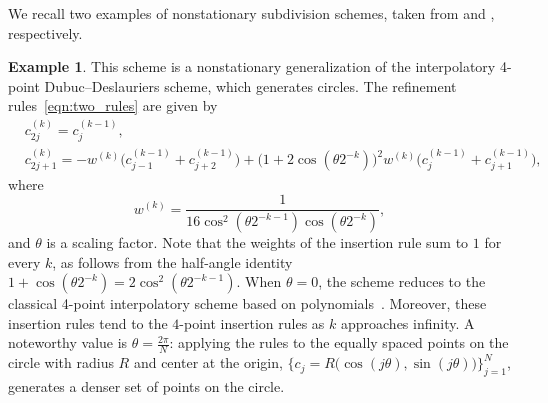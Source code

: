 \documentclass[11pt,a4paper]{article}
\theoremstyle{definition}
\newtheorem{example}[theorem]{Example}
\begin{document}
We recall two examples of nonstationary subdivision schemes, taken from \cite{dyn2003exponentials} and \cite{conti2017beyond}, respectively.

\begin{example}\label{NS example 4-pt}
This scheme is a nonstationary generalization of the interpolatory 4-point Dubuc--Deslauriers scheme, which generates circles. The refinement rules~\eqref{eqn:two_rules} are given by
\begin{equation} \label{NS 4-pt}
\begin{split}
    & c_{2j}^{(k)}=c_j^{(k-1)},\\
    & c_{2j+1}^{(k)}=-w^{(k)}\big(c^{(k-1)}_{j-1}+c^{(k-1)}_{j+2}\big) + \big(1+2\cos(\theta 2^{-k})\big)^2 w^{(k)} \big(c^{(k-1)}_{j}+c^{(k-1)}_{j+1}\big),
\end{split}
\end{equation}
where
\begin{equation*}
    w^{(k)}=\frac{1}{16 \cos^2(\theta 2^{-k-1})\cos(\theta 2^{-k})},
\end{equation*}
and $\theta$ is a scaling factor. Note that the weights of the insertion rule sum to $1$ for every $k$, as follows from the half-angle identity $1+\cos(\theta 2^{-k})=2\cos^2(\theta 2^{-k-1})$. When $\theta=0$, the scheme reduces to the classical 4-point interpolatory scheme based on polynomials~\cite{dyn1991analysis, deslauriers1989symmetric}. Moreover, these insertion rules tend to the $4$-point insertion rules as $k$ approaches infinity. A noteworthy value is $\theta=\frac{2\pi}{N}$: applying the rules to the equally spaced points on the circle with radius $R$ and center at the origin, $\{c_j=R\big(\cos(j\theta),\sin(j\theta)\big)\}_{j=1}^N$, generates a denser set of points on the circle.
\end{example}
\end{document}
